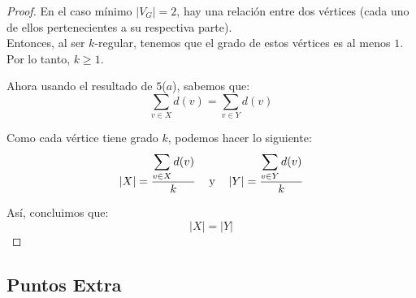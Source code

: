 \documentclass{article}
\begin{document}
\begin{enumerate}
\begin{enumerate}
\begin{proof}
          En el caso mínimo $|V_G| = 2$, hay una relaci\'on entre
          dos v\'ertices (cada uno de ellos pertenecientes a su respectiva
          parte). \\
          Entonces, al ser $k$-regular, tenemos que el grado
          de estos v\'ertices es al menos $1$. \\
          Por lo tanto, $k \geq 1$.

          Ahora usando el resultado de $5$($a$), sabemos que:
          $$\sum_{v \in X} d(v) = \sum_{v \in Y} d(v)$$

          Como cada v\'ertice tiene grado $k$, podemos hacer lo siguiente:
          $$\abs{X} = \frac{\displaystyle \sum_{v \in X} d(v)}{k} \text{\hspace{0.3cm}
            \text{y} \hspace{0.3cm}} \abs{Y} = \frac{\displaystyle \sum_{v \in Y} d(v)}{k}$$

          As\'i, concluimos que:
          $$|X| = |Y|$$
        \end{proof}
    \end{enumerate}
\end{enumerate}

\subsection*{Puntos Extra}
\end{document}

